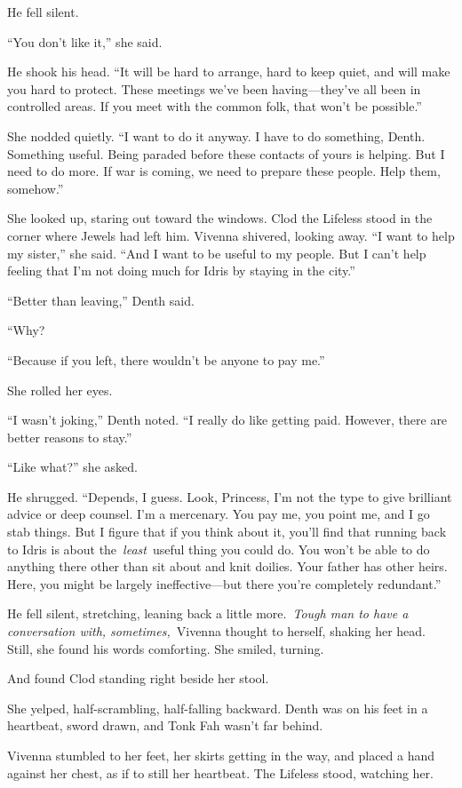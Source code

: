 He fell silent.

“You don’t like it,” she said.

He shook his head. “It will be hard to arrange, hard to keep quiet, and will make you hard to protect. These meetings we’ve been having—they’ve all been in controlled areas. If you meet with the common folk, that won’t be possible.”

She nodded quietly. “I want to do it anyway. I have to do something, Denth. Something useful. Being paraded before these contacts of yours is helping. But I need to do more. If war is coming, we need to prepare these people. Help them, somehow.”

She looked up, staring out toward the windows. Clod the Lifeless stood in the corner where Jewels had left him. Vivenna shivered, looking away. “I want to help my sister,” she said. “And I want to be useful to my people. But I can’t help feeling that I’m not doing much for Idris by staying in the city.”

“Better than leaving,” Denth said.

“Why?

“Because if you left, there wouldn’t be anyone to pay me.”

She rolled her eyes.

“I wasn’t joking,” Denth noted. “I really do like getting paid. However, there are better reasons to stay.”

“Like what?” she asked.

He shrugged. “Depends, I guess. Look, Princess, I’m not the type to give brilliant advice or deep counsel. I’m a mercenary. You pay me, you point me, and I go stab things. But I figure that if you think about it, you’ll find that running back to Idris is about the~\textit{least}~useful thing you could do. You won’t be able to do anything there other than sit about and knit doilies. Your father has other heirs. Here, you might be largely ineffective—but there you’re completely redundant.”

He fell silent, stretching, leaning back a little more.~\textit{Tough man to have a conversation with, sometimes,}~Vivenna thought to herself, shaking her head. Still, she found his words comforting. She smiled, turning.

And found Clod standing right beside her stool.

She yelped, half-scrambling, half-falling backward. Denth was on his feet in a heartbeat, sword drawn, and Tonk Fah wasn’t far behind.

Vivenna stumbled to her feet, her skirts getting in the way, and placed a hand against her chest, as if to still her heartbeat. The Lifeless stood, watching her.

